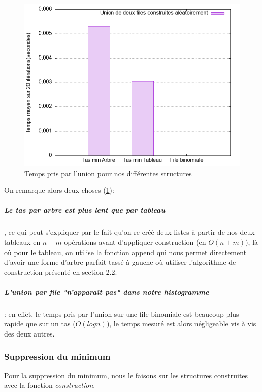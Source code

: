 \documentclass[12pt,a4paper]{article}
\begin{document}
\begin{figure}[hbtp]
\centering
\includegraphics[scale=0.5]{../Images/svg courbes pour rapport/temps_union_shakespeare.png}
\caption{Temps pris par l'union pour nos différentes structures}
\label{fig10}
\end{figure}

On remarque alors deux choses (\ref{fig10}): 

\subparagraph{Le tas par arbre est plus lent que par tableau}, ce qui peut s'expliquer par le fait qu'on re-créé deux listes à partir de nos deux tableaux en $n+m$ opérations avant d'appliquer construction (en $O(n+m)$), là où pour le tableau, on utilise la fonction append qui nous permet directement d'avoir une forme d'arbre parfait tassé à gauche où utiliser l'algorithme de construction présenté en section 2.2.

\subparagraph{L'union par file "n'apparaît pas" dans notre histogramme} : en effet, le temps pris par l'union sur une file binomiale est beaucoup plus rapide que sur un tas ($O(log n)$), le temps mesuré est alors négligeable vis à vis des deux autres.

\subsubsection{Suppression du minimum}
Pour la suppression du minimum, nous le faisons sur les structures construites avec la fonction \textit{construction}.
\end{document}
